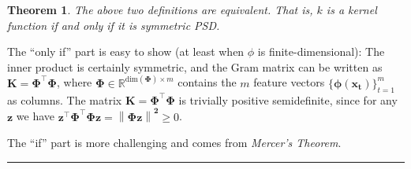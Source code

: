 \documentclass[twoside]{article}
\newcommand{\norm}[1]{\left\lVert #1 \right\rVert}
\newcounter{lecnum}
\newtheorem{theorem}{Theorem}[lecnum]
\newenvironment{proof}{{\bf Proof:}}{\hfill\rule{2mm}{2mm}}
\begin{document}
\begin{theorem}
The above two definitions are equivalent. That is, $k$ is a kernel function if and only if it is symmetric PSD.
\end{theorem}
\begin{proof}
The “only if” part is easy to show (at least when $\phi$ is finite-dimensional): The inner product is certainly symmetric, and the Gram matrix can be written as $\boldsymbol{K = \Phi^\intercal\Phi}$, where $\boldsymbol{\Phi} \in \mathbb{R}^{\text{dim}(\boldsymbol{\Phi}) \times m}$ contains the $m$ feature vectors $\{\boldsymbol{\phi(x_t)}\}_{t = 1}^{m}$ as columns. The matrix $\boldsymbol{K = \Phi^\intercal\Phi}$  is trivially positive semidefinite, since for any $\boldsymbol{z}$ we have $\boldsymbol{z^\intercal\Phi^\intercal\Phi z} = \boldsymbol{\norm{\Phi z}^2} \geq 0$.\medskip

The “if” part is more challenging and comes from \textit{Mercer's Theorem}.
\end{proof}\medskip
\end{document}

